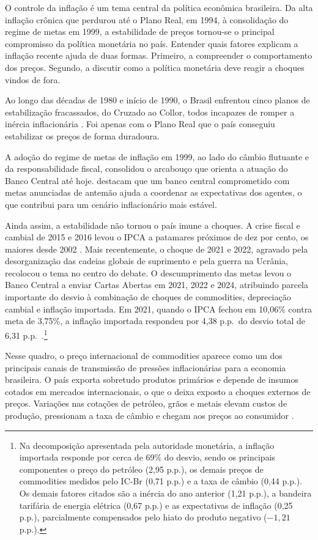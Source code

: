 \documentclass[12pt,openright,oneside,a4paper,portuguese,brazil]{abntex2}
\begin{document}
O controle da inflação é um tema central da política econômica brasileira. Da
alta inflação crônica que perdurou até o Plano Real, em 1994, à consolidação do
regime de metas em 1999, a estabilidade de preços tornou-se o principal
compromisso da política monetária no país. Entender quais fatores explicam a inflação recente ajuda de duas formas.
Primeiro, a compreender o comportamento dos preços. Segundo, a discutir como a
política monetária deve reagir a choques vindos de fora.

Ao longo das décadas de 1980 e início de 1990, o Brasil enfrentou cinco planos
de estabilização fracassados, do Cruzado ao Collor, todos incapazes de romper a
inércia inflacionária \cite{giambiagi2011}. Foi apenas com o Plano Real que o
país conseguiu estabilizar os preços de forma duradoura.

A adoção do regime de metas de inflação em 1999, ao lado do câmbio flutuante e
da responsabilidade fiscal, consolidou o arcabouço que orienta a atuação do
Banco Central até hoje.  destacam que um banco central
comprometido com metas anunciadas de antemão ajuda a coordenar as expectativas
dos agentes, o que contribui para um cenário inflacionário mais estável.

Ainda assim, a estabilidade não tornou o país imune a choques. A crise fiscal e
cambial de 2015 e 2016 levou o IPCA a patamares próximos de dez por cento, os
maiores desde 2002 \cite{ibge_ipca}. Mais recentemente, o choque de 2021 e 2022,
agravado pela desorganização das cadeias globais de suprimento e pela guerra na
Ucrânia, recolocou o tema no centro do debate. O descumprimento das metas levou
o Banco Central a enviar Cartas Abertas em 2021, 2022 e 2024, atribuindo parcela
importante do desvio à combinação de choques de commodities, depreciação cambial
e inflação importada. Em 2021, quando o IPCA fechou em 10,06\% contra meta de
3,75\%, a inflação importada respondeu por 4,38 p.p.\ do desvio total de 6,31
p.p.\ \cite{bcb2022carta}.\footnote{Na decomposição apresentada pela autoridade
monetária, a inflação importada responde por cerca de 69\% do desvio, sendo os
principais componentes o preço do petróleo (2,95 p.p.), os demais preços de
commodities medidos pelo IC-Br (0,71 p.p.) e a taxa de câmbio (0,44 p.p.). Os
demais fatores citados são a inércia do ano anterior (1,21 p.p.), a bandeira
tarifária de energia elétrica (0,67 p.p.) e as expectativas de inflação (0,25
p.p.), parcialmente compensados pelo hiato do produto negativo ($-1{,}21$
p.p.).}

Nesse quadro, o preço internacional de commodities aparece como um dos
principais canais de transmissão de pressões inflacionárias para a economia
brasileira. O país exporta sobretudo produtos primários e depende de insumos
cotados em mercados internacionais, o que o deixa exposto a choques externos de
preços. Variações nas cotações de petróleo, grãos e metais elevam custos de
produção, pressionam a taxa de câmbio e chegam aos preços ao consumidor
\cite{carrarabarros2019}.
\end{document}
